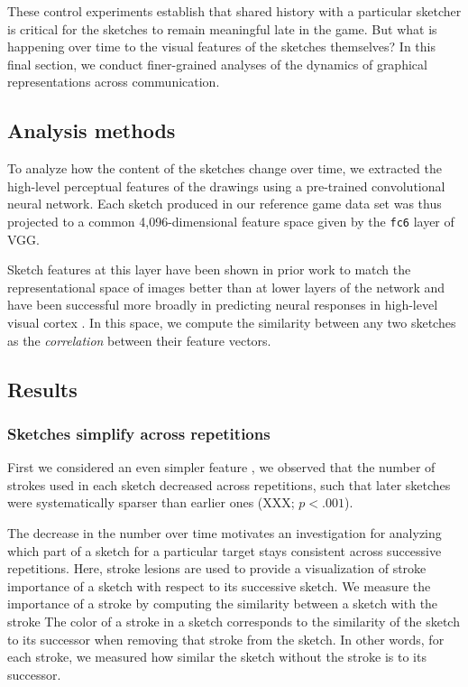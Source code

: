 \documentclass[10pt,letterpaper]{article}
\begin{document}
These control experiments establish that shared history with a particular sketcher is critical for the sketches to remain meaningful late in the game. 
But what is happening over time to the visual features of the sketches themselves? 
In this final section, we conduct finer-grained analyses of the dynamics of graphical representations across communication.



\subsection{Analysis methods}


To analyze how the content of the sketches change over time, we extracted the high-level perceptual features of the drawings using a pre-trained convolutional neural network. 
Each sketch produced in our reference game data set was thus projected to a common 4,096-dimensional feature space given by the \texttt{fc6} layer of VGG. 

Sketch features at this layer have been shown in prior work to match the representational space of images better than at lower layers of the network \cite{FanCommon2018} and have been successful more broadly in predicting neural responses in high-level visual cortex \cite{yamins2014performance}.
In this space, we compute the similarity between any two sketches as the \emph{correlation} between their feature vectors.

\subsection{Results}

\subsubsection{Sketches simplify across repetitions}

First we considered an even simpler feature , we observed that the number of strokes used in each sketch decreased across repetitions, such that later sketches were systematically sparser than earlier ones (XXX; $p < .001$). 

The decrease in the number  over time motivates an investigation for analyzing which part of a sketch for a particular target stays consistent across successive repetitions. 
Here, stroke lesions are used to provide a visualization of stroke importance of a sketch with respect to its successive sketch. 
We measure the importance of a stroke by computing the similarity between a sketch with the stroke 
The color of a stroke in a sketch corresponds to the similarity of the sketch to its successor when removing that stroke from the sketch. 
In other words, for each stroke, we measured how similar the sketch without the stroke is to its successor. 
\end{document}
